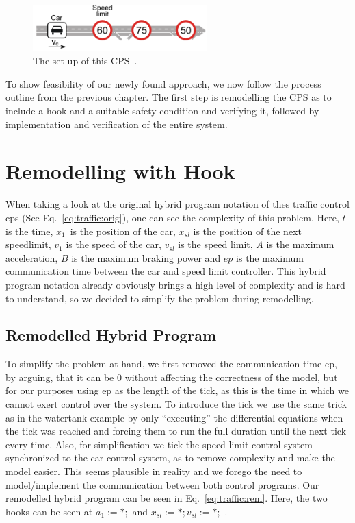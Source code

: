 \begin{figure}[h!]
	\centering
	\includegraphics[width=0.6\textwidth]{images/trafficControl}
	\caption{The set-up of this CPS~\cite{keymaera}.}
	\label{fig:trafficControl}
\end{figure}

To show feasibility of our newly found approach, we now follow the process outline from the previous chapter. The first step is remodelling the CPS as to include a hook and a suitable safety condition and verifying it, followed by implementation and verification of the entire system. 

\section{Remodelling with Hook}
\label{sec:traffic:hook}

When taking a look at the original hybrid program notation of thes traffic control cps (See Eq.~\ref{eq:traffic:orig}), one can see the complexity of this problem. Here, \(t\) is the time, \(x_1\)\ is the position of the car, \(x_{sl}\) is the position of the next speedlimit, \(v_1\) is the speed of the car, \(v_{sl}\) is the speed limit, \(A\) is the maximum acceleration, \(B\) is the maximum braking power and \(ep\) is the maximum communication time between the car and speed limit controller. This hybrid program notation already obviously brings a high level of complexity and is hard to understand, so we decided to simplify the problem during remodelling. 

\subsection{Remodelled Hybrid Program}
\label{subsec:traffic:remodel}
To simplify the problem at hand, we first removed the communication time ep, by arguing, that it can be 0 without affecting the correctness of the model, but for our purposes using ep as the length of the tick, as this is the time in which we cannot exert control over the system. To introduce the tick we use the same trick as in the watertank example by only ``executing'' the differential equations when the tick was reached and forcing them to run the full duration until the next tick every time. Also, for simplification we tick the speed limit control system synchronized to the car control system, as to remove complexity and make the model easier. This seems plausible in reality and we forego the need to model/implement the communication between both control programs. Our remodelled hybrid program can be seen in Eq.~\ref{eq:traffic:rem}. Here, the two hooks can be seen at \(a_1:=*;\) and \(x_{sl} :=*; v_{sl} := *;\) .

